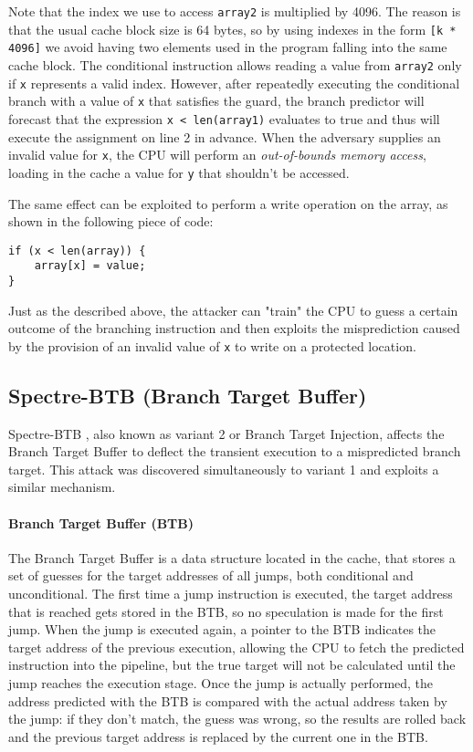 \documentclass[12pt,a4paper]{book}
\theoremstyle{definition}
\begin{document}
	Note that the index we use to access \texttt{array2} is multiplied by 4096. The reason is that the usual cache block size is 64 bytes, so by using indexes in the form \texttt{[k * 4096]} we avoid having two elements used in the program falling into the same cache block.
	The conditional instruction allows reading a value from \texttt{array2} only if \texttt{x} represents a valid index. However, after repeatedly executing the conditional branch with a value of \texttt{x} that satisfies the guard, the branch predictor will forecast that the expression \texttt{x < len(array1)} evaluates to true and thus will execute the assignment on line 2 in advance. When the adversary supplies an invalid value for \texttt{x}, the CPU will perform an \textit{out-of-bounds memory access}, loading in the cache a value for \texttt{y} that shouldn't be accessed.
	
	The same effect can be exploited to perform a write operation on the array, as shown in the following piece of code:
	
	\vspace{3mm}
	\begin{minipage}{.5\textwidth}
		\begin{lstlisting}
if (x < len(array)) { 
	array[x] = value; 
}
		\end{lstlisting} 
	\end{minipage}
	
	Just as the described above, the attacker can "train" the CPU to guess a certain outcome of the branching instruction and then exploits the misprediction caused by the provision of an invalid value of \texttt{x} to write on a protected location.
	\subsection{Spectre-BTB (Branch Target Buffer)}\label{sec:spectre-btb}
	Spectre-BTB \cite{Kocher2019} \cite{Canella2019}, also known as variant 2 or Branch Target Injection, affects the Branch Target Buffer to deflect the transient execution to a mispredicted branch target. This attack was discovered simultaneously to variant 1 and exploits a similar mechanism.
	
	\paragraph{Branch Target Buffer (BTB)} The Branch Target Buffer \cite{Perleberg1989} is a data structure located in the cache, that stores a set of guesses for the target addresses of all jumps, both conditional and unconditional. The first time a jump instruction is executed, the target address that is reached gets stored in the BTB, so no speculation is made for the first jump. When the jump is executed again, a pointer to the BTB indicates the target address of the previous execution, allowing the CPU to fetch the  predicted instruction into the pipeline, but the true target will not be calculated until the jump reaches the execution stage. Once the jump is actually performed, the address predicted with the BTB is compared with the actual address taken by the jump: if they don't match, the guess was wrong, so the results are rolled back and the previous target address is replaced by the current one in the BTB.
\end{document}
